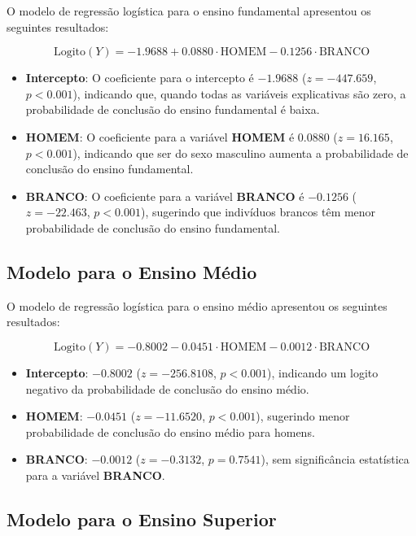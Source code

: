 \documentclass[a4paper,12pt]{article}
\begin{document}
O modelo de regressão logística para o ensino fundamental apresentou os seguintes resultados:

\begin{equation}
\text{Logito}(Y) = -1.9688 + 0.0880 \cdot \text{HOMEM} - 0.1256 \cdot \text{BRANCO}
\end{equation}

\begin{itemize}
    \item \textbf{Intercepto}: O coeficiente para o intercepto é $-1.9688$ ($z = -447.659$, $p < 0.001$), indicando que, quando todas as variáveis explicativas são zero, a probabilidade de conclusão do ensino fundamental é baixa.
    \item \textbf{HOMEM}: O coeficiente para a variável \textbf{HOMEM} é $0.0880$ ($z = 16.165$, $p < 0.001$), indicando que ser do sexo masculino aumenta a probabilidade de conclusão do ensino fundamental.
    \item \textbf{BRANCO}: O coeficiente para a variável \textbf{BRANCO} é $-0.1256$ ($z = -22.463$, $p < 0.001$), sugerindo que indivíduos brancos têm menor probabilidade de conclusão do ensino fundamental.
\end{itemize}

\subsection{Modelo para o Ensino Médio}

O modelo de regressão logística para o ensino médio apresentou os seguintes resultados:

\begin{equation}
\text{Logito}(Y) = -0.8002 - 0.0451 \cdot \text{HOMEM} - 0.0012 \cdot \text{BRANCO}
\end{equation}

\begin{itemize}
    \item \textbf{Intercepto}: $-0.8002$ ($z = -256.8108$, $p < 0.001$), indicando um logito negativo da probabilidade de conclusão do ensino médio.
    \item \textbf{HOMEM}: $-0.0451$ ($z = -11.6520$, $p < 0.001$), sugerindo menor probabilidade de conclusão do ensino médio para homens.
    \item \textbf{BRANCO}: $-0.0012$ ($z = -0.3132$, $p = 0.7541$), sem significância estatística para a variável \textbf{BRANCO}.
\end{itemize}

\subsection{Modelo para o Ensino Superior}
\end{document}
